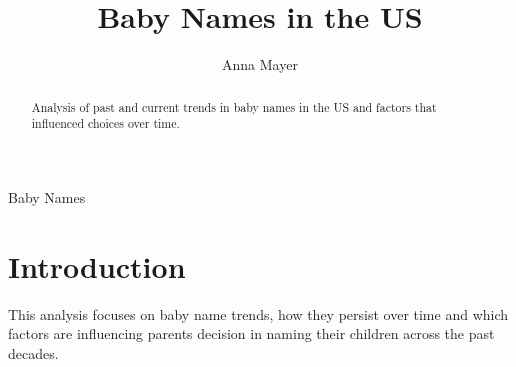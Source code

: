 \documentclass[11pt,preprint, authoryear]{elsarticle}
\numberwithin{equation}{section}
\numberwithin{figure}{section}
\numberwithin{table}{section}
\begin{document}
\begin{frontmatter}  %

\title{Baby Names in the US}





\author[Add1]{Anna Mayer}





\address[Add1]{Stellenbosch University}


\begin{abstract}
\small{
Analysis of past and current trends in baby names in the US and factors
that influenced choices over time.
}
\end{abstract}

\vspace{1cm}


\begin{keyword}
\footnotesize{
Baby Names \\
\vspace{0.3cm}
}
\end{keyword}



\vspace{0.5cm}

\end{frontmatter}

\setcounter{footnote}{0}



\pagestyle{fancy}
\chead{}
\rhead{}
\lfoot{}
\lhead{}
\cfoot{}


\headsep 35pt %




\hypertarget{introduction}{%
\section{\texorpdfstring{Introduction
\label{Introduction}}{Introduction }}\label{introduction}}

This analysis focuses on baby name trends, how they persist over time
and which factors are influencing parents decision in naming their
children across the past decades.
\end{document}
